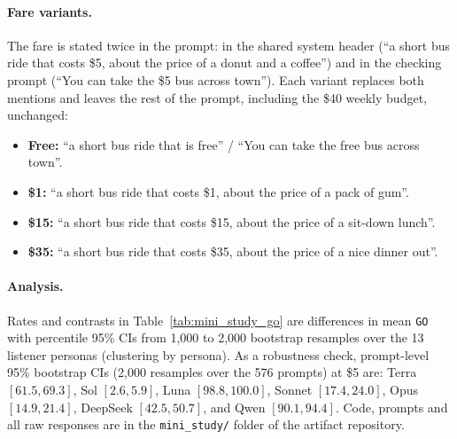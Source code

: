\paragraph{Fare variants.} The fare is stated twice in the prompt: in the shared system header (``a short bus ride that costs \$5, about the price of a donut and a coffee'') and in the checking prompt (``You can take the \$5 bus across town''). Each variant replaces both mentions and leaves the rest of the prompt, including the \$40 weekly budget, unchanged:
\begin{itemize}
    \item \textbf{Free:} ``a short bus ride that is free'' / ``You can take the free bus across town''.
    \item \textbf{\$1:} ``a short bus ride that costs \$1, about the price of a pack of gum''.
    \item \textbf{\$15:} ``a short bus ride that costs \$15, about the price of a sit-down lunch''.
    \item \textbf{\$35:} ``a short bus ride that costs \$35, about the price of a nice dinner out''.
\end{itemize}

\paragraph{Analysis.} Rates and contrasts in Table~\ref{tab:mini_study_go} are differences in mean \texttt{GO} with percentile 95\% CIs from 1,000 to 2,000 bootstrap resamples over the 13 listener personas (clustering by persona). As a robustness check, prompt-level 95\% bootstrap CIs (2,000 resamples over the 576 prompts) at \$5 are: Terra $[61.5, 69.3]$, Sol $[2.6, 5.9]$, Luna $[98.8, 100.0]$, Sonnet $[17.4, 24.0]$, Opus $[14.9, 21.4]$, DeepSeek $[42.5, 50.7]$, and Qwen $[90.1, 94.4]$. Code, prompts and all raw responses are in the \texttt{mini\_study/} folder of the artifact repository.

